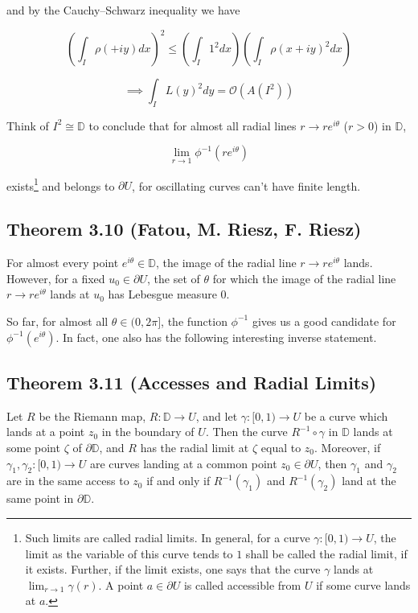 \documentclass[11pt,a4paper]{article}
\begin{document}
        and by the Cauchy--Schwarz inequality we have

        $$\left(\int_{I}{\rho(+iy)dx}\right)^2 \leq \left(\int_{I}{1^2dx}\right)\left(\int_{I}{\rho(x+iy)^2dx}\right)$$

        $$\implies \int_{I}{L(y)^2dy} = \mathcal{O}(A(I^2))$$


        Think of $I^2 \cong \mathbb{D}$ to conclude that for almost all radial lines $r \rightarrow re^{i\theta}$ ($r>0$) in $\mathbb{D}$,

        $$\lim_{r \rightarrow 1}{\phi^{-1}(re^{i\theta})} $$

        exists\footnote{Such limits are called radial limits. In general, for a curve $\gamma: [0,1) \rightarrow U$, the limit as the variable of this curve tends to $1$ shall be called the radial limit, if it exists. Further, if the limit exists, one says that the curve $\gamma$ lands at $\lim_{r\rightarrow1}{\gamma(r)}$. A point $a \in \partial U$ is called accessible from $U$ if some curve lands at $a$.} and belongs to $\partial U$, for oscillating curves can't have finite length.

      \subsection*{Theorem 3.10 (Fatou, M. Riesz, F. Riesz)} For almost every point $e^{i\theta} \in \mathbb{D}$, the image of the radial line $r \rightarrow re^{i\theta}$ lands. However, for a fixed $u_0 \in \partial U$, the set of $\theta$ for which the image of the radial line $r \rightarrow re^{i\theta}$ lands at $u_0$ has Lebesgue measure $0$.



      So far, for almost all $\theta \in (0, 2\pi]$, the function $\phi^{-1}$ gives us a good candidate for $\phi^{-1}(e^{i\theta})$. In fact, one also has the following interesting inverse statement.

      \subsection*{Theorem 3.11 (Accesses and Radial Limits)} Let $R$ be the Riemann map, $R:\mathbb{D} \rightarrow U$, and let $\gamma: [0,1) \rightarrow U$ be a curve
      which lands at a point $z_0$ in the boundary of $U$. Then the curve $R^{-1} \circ \gamma$ in $\mathbb{D}$ lands at some point $\zeta$ of $\partial\mathbb{D}$, and $R$ has the radial limit at $\zeta$ equal to $z_0$. Moreover, if $\gamma_1, \gamma_2: [0,1) \rightarrow U$ are curves landing at a common point $z_0 \in \partial U$, then $\gamma_1$ and $\gamma_2$ are in the same access to $z_0$ if and only if $R^{-1}(\gamma_1)$ and $R^{-1}(\gamma_2)$ land at the same point in $\partial \mathbb{D}$.
\end{document}
